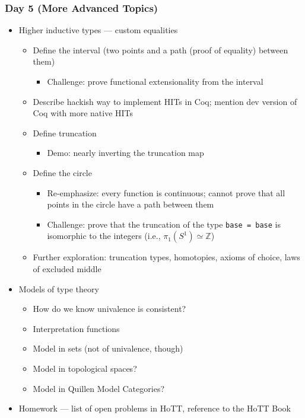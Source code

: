 \documentclass{article}
\begin{document}
\subsubsection*{Day 5 (More Advanced Topics)}
\begin{itemize}
  \item Higher inductive types --- custom equalities
    \begin{itemize}
      \item Define the interval (two points and a path (proof of equality) between them)
      \begin{itemize}
        \item Challenge: prove functional extensionality from the interval
      \end{itemize}
      \item Describe hackish way to implement HITs in Coq; mention dev version of Coq with more native HITs
      \item Define truncation
      \begin{itemize}
        \item Demo: nearly inverting the truncation map
      \end{itemize}
      \item Define the circle
      \begin{itemize}
        \item Re-emphasize: every function is continuous; cannot prove that all points in the circle have a path between them
        \item Challenge: prove that the truncation of the type \texttt{base = base} is isomorphic to the integers (i.e., $\pi_1(S^1) \simeq \mathbb{Z}$)
      \end{itemize}
      \item Further exploration: truncation types, homotopies, axioms of choice, laws of excluded middle
  \end{itemize}
  \item Models of type theory
  \begin{itemize}
    \item How do we know univalence is consistent?
    \item Interpretation functions
    \item Model in sets (not of univalence, though)
    \item Model in topological spaces?
    \item Model in Quillen Model Categories?
  \end{itemize}
  \item Homework --- list of open problems in HoTT, reference to the HoTT Book
\end{itemize}
\end{document}
